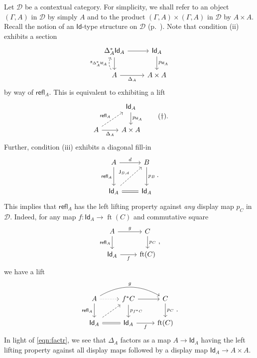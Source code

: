 \documentclass[10pt,letterpaper,cm]{nupset}
\theoremstyle{definition}
\theoremstyle{theorem}
\theoremstyle{remark}
\DeclareMathOperator{\ft}{ft}
\newcommand{\J}{\mathsf{J}}
\newcommand{\id}{\mathsf{Id}}
\newcommand{\refl}{\mathsf{refl}}
\newcommand{\0}{\mathbf{0}}
\newcommand{\1}{\mathbf{1}}
\newcommand{\2}{\mathbf{2}}
\renewcommand{\d}{\mathscr{D}}
\begin{document}
Let $\d$ be a contextual category. For simplicity, we shall refer to an object $\left(\Gamma, A\right)$ in $\d$ by simply $A$ and to the product $\left(\Gamma, A\right) \times \left(\Gamma, A\right)$ in $\d$ by $A \times A$. Recall the notion of an $\id$-type structure on $\d$ (p.~\pageref{idtype}).  Note that condition (ii) exhibits a section
\[
\begin{tikzcd}
\Delta_A^{\ast}{\id_A} \arrow[d] \arrow[r]                                        & \id_A \arrow[d, "p_{\id_A}"] \\
A \arrow[r, "\Delta_A"'] \arrow[u, "s_{\Delta_A^{\ast}\id_A}", dashed, bend left] & A \times A                  
\end{tikzcd}
\] by way of $\refl_A$. This is equivalent to exhibiting a lift
\[
\label{eqn:factr}\begin{tikzcd}
                                                       & \id_A \arrow[d, "p_{\id_A}"] \\
A \arrow[r, "\Delta_A"'] \arrow[ru, "\refl_A", dashed] & A \times A                  
\end{tikzcd} \tag{$\dagger$}
.\] Further, condition (iii) exhibits a diagonal fill-in 
\[
\begin{tikzcd}[row sep=large]
A \arrow[r, "d"] \arrow[d, "\refl_A"']           & B \arrow[d, "p_B"] \\
\id_A \arrow[r, equal] \arrow[ru, "{\J_{B,d}}", dashed] & \id_A             
\end{tikzcd}.
\] This implies that $\refl_A$ has the left lifting property against \emph{any} display map $p_C$ in $\d$. Indeed, for any map $f: \id_A \to \ft(C)$ and commutative square
\[
\begin{tikzcd}
A \arrow[d, "\refl_A"'] \arrow[r, "g"] & C \arrow[d, "p_C"] \\
\id_A \arrow[r, "f"']             & \ft(C)            
\end{tikzcd}
,\] we have a lift 
\[
\begin{tikzcd}
A \arrow[r, dotted] \arrow[d, "\refl_A"'] \arrow[rr, "g", bend left] & f^{\ast}{C} \arrow[r] \arrow[d, "p_{f^{\ast}{C}}"] & C \arrow[d, "p_C"] \\
\id_A \arrow[r, equal] \arrow[ru, dashed]                                   & \id_A \arrow[r, "f"']                              & \ft(C)            
\end{tikzcd}.
\] In light of \eqref{eqn:factr},  we see that $\Delta_A$ factors as a map $A \to \id_A$ having the left lifting property against all display maps followed by a display map $ \id_A \to A\times A$. 
\end{document}

